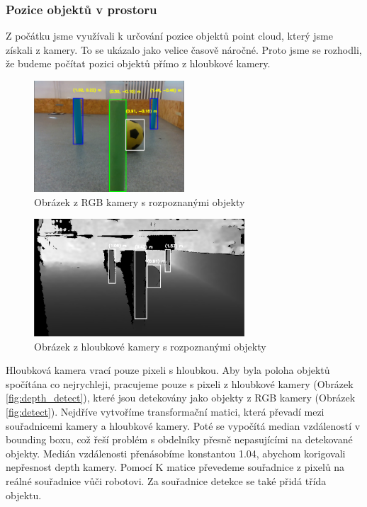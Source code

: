 \documentclass[a4paper,12pt]{article}
\begin{document}
\subsubsection{Pozice objektů v prostoru}
\label{sec:point_cloud}
Z počátku jsme využívali k určování pozice objektů point cloud, který jsme získali z kamery.
To se ukázalo jako velice časově náročné. Proto jsme se rozhodli, že budeme počítat pozici objektů přímo z hloubkové kamery.
\begin{figure}[H]
    \centering
    \includegraphics[width=0.5\textwidth]{pictures/detect.png}
    \caption{Obrázek z RGB kamery s rozpoznanými objekty}
    \label{fig:detect}
\end{figure}
\begin{figure}[H]
    \centering
    \includegraphics[width=0.7\textwidth]{pictures/depth_detect.png}
    \caption{Obrázek z hloubkové kamery s rozpoznanými objekty}
    \label{fig:depth_detect}
\end{figure}
Hloubková kamera vrací pouze pixeli s hloubkou. Aby byla poloha objektů spočítána co nejrychleji, pracujeme pouze s pixeli z hloubkové kamery (Obrázek \eqref{fig:depth_detect}), které jsou detekovány jako objekty z RGB kamery (Obrázek \eqref{fig:detect}).
Nejdříve vytvoříme transformační matici, která převadí mezi souřadnicemi kamery a hloubkové kamery. Poté se vypočítá median vzdáleností v bounding boxu, což řeší problém s obdelníky přesně nepasujícími na detekované objekty. 
Medián vzdálenosti přenásobíme konstantou 1.04, abychom korigovali nepřesnost depth kamery.
Pomocí K matice převedeme souřadnice z pixelů na reálné souřadnice vůči robotovi. Za souřadnice detekce se také přidá třída objektu.
\end{document}
